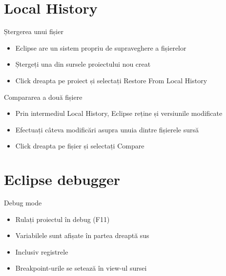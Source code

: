 \documentclass{beamer}
\begin{document}
\section{Local History}

\begin{frame}{Ștergerea unui fișier}
  \begin{itemize}
  \item Eclipse are un sistem propriu de supraveghere a fișierelor
  \pause
  \item Ștergeți una din sursele proiectului nou creat
  \pause
  \item Click dreapta pe proiect și selectați Restore From Local History
  \end{itemize}    
\end{frame}

\begin{frame}{Compararea a două fișiere}
  \begin{itemize}
  \item Prin intermediul Local History, Eclipse reține și versiunile modificate 
  \pause
  \item Efectuați câteva modificări asupra unuia dintre fișierele sursă
  \pause
  \item Click dreapta pe fișier și selectați Compare
  \end{itemize}
\end{frame}

\section{Eclipse debugger}

\begin{frame}{Debug mode}
  \begin{itemize}
  \item Rulați proiectul în debug (F11) 
  \pause
  \item Variabilele sunt afișate în partea dreaptă sus
  \pause
  \item Inclusiv registrele 
  \pause
  \item Breakpoint-urile se setează în view-ul sursei
  \end{itemize}
\end{frame}

\begin{frame}{}
\end{frame}
\end{document}
